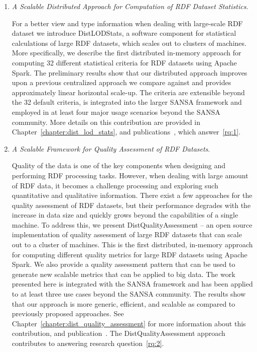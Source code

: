 \begin{enumerate}
    \item \textit{A Scalable Distributed Approach for Computation of \gls{RDF} Dataset Statistics}.
    
    For a better view and type information when dealing with large-scale \gls{RDF} dataset we introduce DistLODStats, a software component for statistical calculations of large \gls{RDF} datasets, which scales out to clusters of machines.
    More specifically, we describe the first distributed in-memory approach for computing 32 different statistical criteria for \gls{RDF} datasets using Apache Spark.
    The preliminary results show that our distributed approach improves upon a previous centralized approach we compare against and provides approximately linear horizontal scale-up.
    The criteria are extensible beyond the 32 default criteria, is integrated into the larger SANSA framework and employed in at least four major usage scenarios beyond the SANSA community.
    More details on this contribution are provided in Chapter~\ref{chapter:dist_lod_stats}, and publications~\cite{sejdiu-2018-dist-lod-stats-iswc, sejdiu-2018-statisfy-iswc-poster}, which answer~\ref{rq:1}.
    
    \item \textit{A Scalable Framework for Quality Assessment of \gls{RDF} Datasets}.
    
    Quality of the data is one of the key components when designing and performing \gls{RDF} processing tasks.
    However, when dealing with large amount of \gls{RDF} data, it becomes a challenge processing and exploring such quantitative and qualitative information.
    There exist a few approaches for the quality assessment of \gls{RDF} datasets, but their performance degrades with the increase in data size and quickly grows beyond the capabilities of a single machine. 
    To address this, we present DistQualityAssessment -- an open source implementation of quality assessment of large \gls{RDF} datasets that can scale out to a cluster of machines.
    This is the first distributed, in-memory approach for computing different quality metrics for large \gls{RDF} datasets using Apache Spark. We also provide a quality assessment pattern that can be used to generate new scalable metrics that can be applied to big data.
    The work presented here is integrated with the SANSA framework and has been applied to at least three use cases beyond the SANSA community.   
    The results show that our approach is more generic, efficient, and scalable as compared to previously proposed approaches.
    See Chapter~\ref{chapter:dist_quality_assessment} for more information about this contribution, and publication~\cite{sejdiu-2019-sansa-dist-quality-assessment-iswc}.
    The DistQualityAssessment approach contributes to answering research question~\ref{rq:2}.
    

\end{enumerate}
